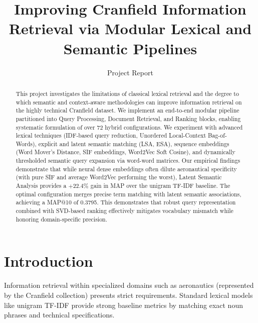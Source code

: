 \documentclass[runningheads]{llncs}
\begin{document}
\title{Improving Cranfield Information Retrieval via Modular Lexical and Semantic Pipelines} 


\author{Project Report}

%
\maketitle   %
%
\begin{abstract}
This project investigates the limitations of classical lexical retrieval and the degree to which semantic and context-aware methodologies can improve information retrieval on the highly technical Cranfield dataset. We implement an end-to-end modular pipeline partitioned into Query Processing, Document Retrieval, and Ranking blocks, enabling systematic formulation of over 72 hybrid configurations. We experiment with advanced lexical techniques (IDF-based query reduction, Unordered Local-Context Bag-of-Words), explicit and latent semantic matching (LSA, ESA), sequence embeddings (Word Mover's Distance, SIF embeddings, Word2Vec Soft Cosine), and dynamically thresholded semantic query expansion via word-word matrices. Our empirical findings demonstrate that while neural dense embeddings often dilute aeronautical specificity (with pure SIF and average Word2Vec performing the worst), Latent Semantic Analysis provides a $+22.4\%$ gain in MAP over the unigram TF-IDF baseline. The optimal configuration merges precise term matching with latent semantic associations, achieving a MAP@10 of 0.3795. This demonstrates that robust query representation combined with SVD-based ranking effectively mitigates vocabulary mismatch while honoring domain-specific precision.

\end{abstract}

\section{Introduction}
Information retrieval within specialized domains such as aeronautics (represented by the Cranfield collection) presents strict requirements. Standard lexical models like unigram TF-IDF provide strong baseline metrics by matching exact noun phrases and technical specifications. 
\end{document}
